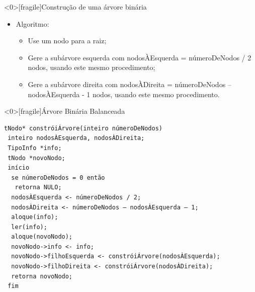 \documentclass[12pt,table,xcolor={dvipsnames}]{beamer}
\begin{document}
\begin{frame}<0>[fragile]{Construção de uma árvore binária}
          \begin{itemize}
          \item Algoritmo:
          \begin{itemize}
          \item Use um nodo para a raiz;
          \item Gere a subárvore esquerda com nodosÀEsquerda = númeroDeNodos / 2 nodos, usando este mesmo procedimento;
          \item Gere a subárvore direita com nodosÀDireita = númeroDeNodos – nodosÀEsquerda - 1 nodos, usando este mesmo procedimento.
          \end{itemize}
       	  \end{itemize}
\end{frame}

\begin{frame}<0>[fragile]{Árvore Binária Balanceada}
          \begin{lstlisting}
tNodo* constróiÁrvore(inteiro númeroDeNodos)
 inteiro nodosÀEsquerda, nodosÀDireita;
 TipoInfo *info;
 tNodo *novoNodo;
 início
  se númeroDeNodos = 0 então
   retorna NULO;
  nodosÀEsquerda <- númeroDeNodos / 2;
  nodosÀDireita <- númeroDeNodos – nodosÀEsquerda – 1;
  aloque(info);
  ler(info);
  aloque(novoNodo);
  novoNodo->info <- info;
  novoNodo->filhoEsquerda <- constróiÁrvore(nodosÀEsquerda);
  novoNodo->filhoDireita <- constróiÁrvore(nodosÀDireita);
  retorna novoNodo;
 fim
		  \end{lstlisting}

\end{frame} 
\end{document}
